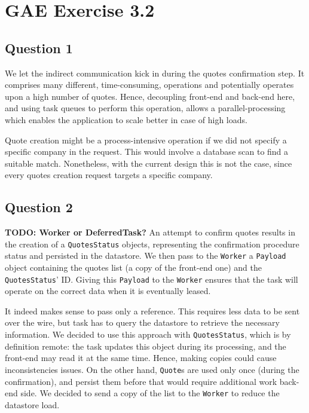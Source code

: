 \section{GAE Exercise 3.2}
\subsection{Question 1}
We let the indirect communication kick in during the quotes confirmation step. It comprises many different, time-consuming, operations and potentially operates upon a high number of quotes. Hence, decoupling front-end and back-end here, and using task queues to perform this operation, allows a parallel-processing which enables the application to scale better in case of high loads.

Quote creation might be a process-intensive operation if we did not specify a specific company in the request. This would involve a database scan to find a suitable match. Nonetheless, with the current design this is not the case, since every quotes creation request targets a specific company.

\subsection{Question 2} \textbf{TODO: Worker or DeferredTask?}
An attempt to confirm quotes results in the creation of a \texttt{QuotesStatus} objects, representing the confirmation procedure status and persisted in the datastore. We then pass to the \texttt{Worker} a \texttt{Payload} object containing the quotes list (a copy of the front-end one) and the \texttt{QuotesStatus}' ID. Giving this \texttt{Payload} to the \texttt{Worker} ensures that the task will operate on the correct data when it is eventually leased.

It indeed makes sense to pass only a reference. This requires less data to be sent over the wire, but task has to query the datastore to retrieve the necessary information. We decided to use this approach with \texttt{QuotesStatus}, which is by definition remote: the task updates this object during its processing, and the front-end may read it at the same time. Hence, making copies could cause inconsistencies issues. On the other hand, \texttt{Quote}s are used only once (during the confirmation), and persist them before that would require additional work back-end side. We decided to send a copy of the list to the \texttt{Worker} to reduce the datastore load.